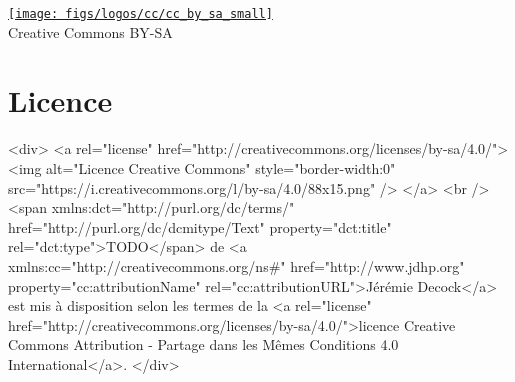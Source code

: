 \ifpdf

    \vfill %
    \begin{center}
        \href{http://creativecommons.org/licenses/by-sa/4.0/}{\texttt{[image: figs/logos/cc/cc\_by\_sa\_small]}}\\
        \small{Creative Commons BY-SA}
    \end{center}

\else

    \section*{Licence}\label{sec:license}

    \begin{rawhtml}

        <div>
            <a rel="license" href="http://creativecommons.org/licenses/by-sa/4.0/">
                <img alt="Licence Creative Commons" style="border-width:0" src="https://i.creativecommons.org/l/by-sa/4.0/88x15.png" />
            </a>
            <br />
            <span xmlns:dct="http://purl.org/dc/terms/" href="http://purl.org/dc/dcmitype/Text" property="dct:title" rel="dct:type">TODO</span>
            de <a xmlns:cc="http://creativecommons.org/ns#" href="http://www.jdhp.org" property="cc:attributionName" rel="cc:attributionURL">Jérémie Decock</a>
            est mis à disposition selon les termes de la
            <a rel="license" href="http://creativecommons.org/licenses/by-sa/4.0/">licence Creative Commons Attribution -  Partage dans les Mêmes Conditions 4.0 International</a>.
        </div>

    \end{rawhtml}

\fi

